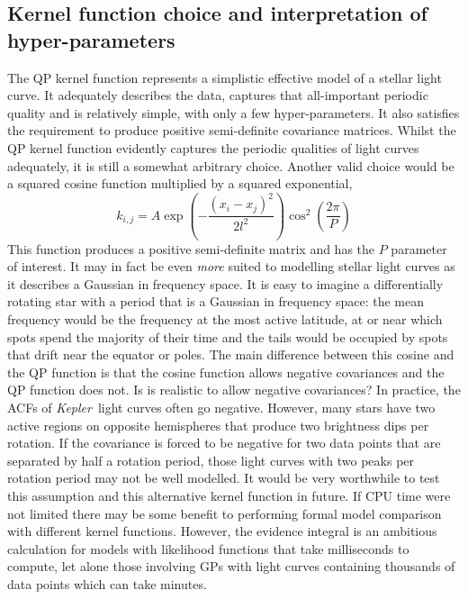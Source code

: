 \documentclass[useAMS, usenatbib, preprint, 12pt]{aastex}
\newcommand{\Kepler}{{\it Kepler}}
\begin{document}
\subsection{Kernel function choice and interpretation of hyper-parameters}
The QP kernel function represents a simplistic effective model of a stellar
light curve.
It adequately describes the data, captures that all-important periodic quality
and is relatively simple, with only a few hyper-parameters.
It also satisfies the requirement to produce positive semi-definite covariance
matrices.
Whilst the QP kernel function evidently captures the periodic qualities of
light curves adequately, it is still a somewhat arbitrary choice.
Another valid choice would be a squared cosine function multiplied by a
squared exponential,
\begin{equation}
k_{i,j} = A \exp \left(-\frac{(x_i - x_j)^2}{2l^2}\right)
\cos^2\left(\frac{2\pi}{P}\right)
\end{equation}
\label{eq:cos_kernel}
This function produces a positive semi-definite matrix and has the $P$
parameter of interest.
It may in fact be even {\it more} suited to modelling stellar
light curves as it describes a Gaussian in frequency space.
It is easy to imagine a differentially rotating star with a period that is a
Gaussian in frequency space: the mean frequency would be the frequency at the
most active latitude, at or near which spots spend the majority of their time
and the tails would be occupied by spots that drift near the equator or poles.
The main difference between this cosine and the QP function is that the cosine
function allows negative covariances and the QP function does not.
Is is realistic to allow negative covariances?
In practice, the ACFs of \Kepler\ light curves often go negative.
However, many stars have two active regions on opposite hemispheres that
produce two brightness dips per rotation.
If the covariance is forced to be negative for two data points that are
separated by half a rotation period, those light curves with two peaks per
rotation period may not be well modelled.
It would be very worthwhile to test this assumption and this alternative
kernel function in future.
If CPU time were not limited there may be some benefit to performing formal
model comparison with different kernel functions.
However, the evidence integral is an ambitious calculation for models with
likelihood functions that take milliseconds to compute, let alone those
involving GPs with light curves containing thousands of data points which can
take minutes.
\end{document}
